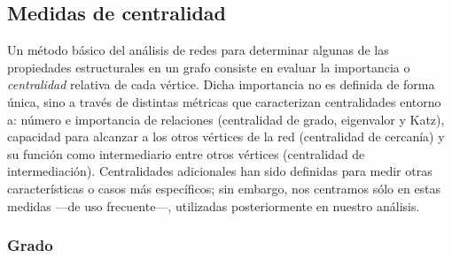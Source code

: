 \documentclass[letterpaper, 11pt]{book}
\theoremstyle{definition}
\theoremstyle{remark}
\begin{document}
\subsection{Medidas de centralidad}
\label{subsec:centralidades}
Un método básico del análisis de redes para determinar algunas de las propiedades estructurales en un grafo consiste en evaluar la importancia o \emph{centralidad} relativa de cada vértice. 
Dicha importancia no es definida de forma única, sino a través de distintas métricas que caracterizan centralidades entorno a: número e importancia de relaciones (centralidad de grado, eigenvalor y Katz), capacidad para alcanzar a los otros vértices de la red (centralidad de cercanía) y su función como intermediario entre otros vértices (centralidad de intermediación). 
Centralidades adicionales han sido definidas para medir otras características o casos más específicos; sin embargo, nos centramos sólo en estas medidas ---de uso frecuente---, utilizadas posteriormente en nuestro análisis.


\subsubsection{Grado}
\label{sec:centralidadGrado}
\end{document}
